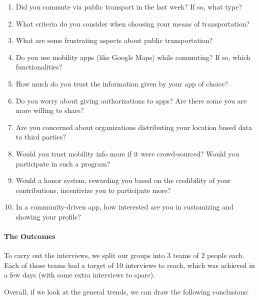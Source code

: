 \documentclass[a4paper, 11pt]{report}
\newenvironment{titlebox}[1][]{%
  \centering
  \basecolorbox[#1]%
}{%
  \endbasecolorbox%
}
\begin{document}
\begin{titlebox}[The Questions:]
	\begin{enumerate}
		\item Did you commute via public transport in the last week? If so, what type?
		\item What criteria do you consider when choosing your means of transportation?
		\item What are some frustrating aspects about public transportation?
		\item Do you use mobility apps (like Google Maps) while commuting? If so, which
		      functionalities?
		\item How much do you trust the information given by your app of choice?
		\item Do you worry about giving authorizations to apps? Are there some you are more willing to share?
		\item Are you concerned about organizations distributing your location based data to third parties?
		\item Would you trust mobility info more if it were crowd-sourced? Would you participate
		      in such a program?
		\item Would a honor system, rewarding you based on the credibility of
		      your contributions, incentivize you to participate more?
		\item In a community-driven app, how interested are you in customizing and showing your
		      profile?
	\end{enumerate}
\end{titlebox}

\paragraph{The Outcomes}

To carry out the interviews, we split our groups into 3 teams of 2 people each. Each of those
teams had a target of 10 interviews to reach, which was achieved in a few days (with
some extra interviews to spare).

Overall, if we look at the general trends, we can draw the following conclusions:
\end{document}
